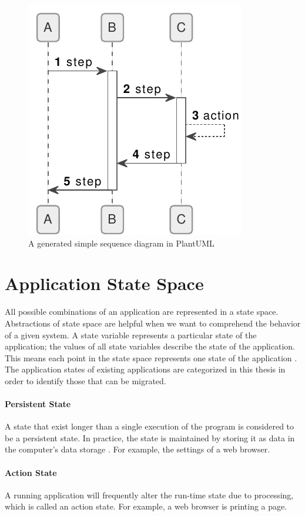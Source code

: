 \FloatBarrier
\begin{figure}[H]
    \includegraphics[scale=1]{../figures/example.pdf}
    \centering
    \caption{A generated simple sequence diagram in PlantUML}
    \label{fig:plantuml}
\end{figure}
\FloatBarrier

\section{Application State Space}
All possible combinations of an application are represented in a state space. Abstractions of state space are helpful when we want to comprehend the behavior of a given system. A state variable represents a particular state of the application; the values of all state variables describe the state of the application. This means each point in the state space represents one state of the application \cite{state-space}. The application states of existing applications are categorized in this thesis in order to identify those that can be migrated.

\paragraph{Persistent State}
A state that exist longer than a single execution of the program is considered to be a persistent state. In practice, the state is maintained by storing it as data in the computer's data storage \cite{pstate}. For example, the settings of a web browser.


\paragraph{Action State}
A running application will frequently alter the run-time state due to processing, which is called an action state. For example, a web browser is printing a page.

